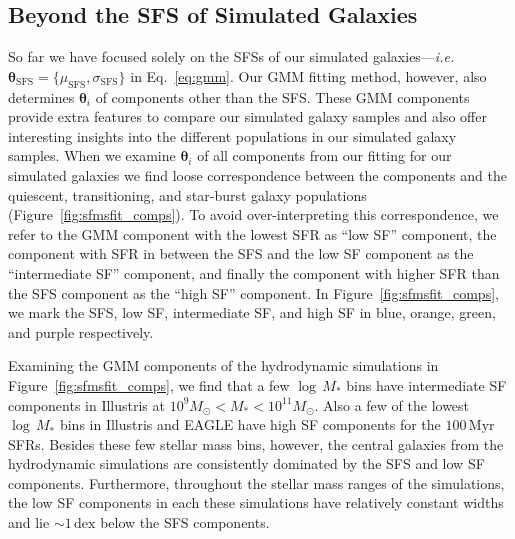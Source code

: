 \documentclass[preprint2,tighten]{aastex62}
\begin{document}
\subsection{Beyond the SFS of Simulated Galaxies} \label{sec:beyondsfms}
So far we have focused solely on the SFSs of our simulated 
galaxies---\emph{i.e.} 
$\bm{\theta}_\mathrm{SFS} = \{\mu_\mathrm{SFS}, \sigma_\mathrm{SFS} \}$ 
in Eq.~\ref{eq:gmm}. Our GMM fitting method, however, also determines 
$\bm{\theta}_i$ of components other than the SFS. These GMM components 
provide extra features to compare our simulated galaxy samples and also 
offer interesting insights into the different populations in our simulated 
galaxy samples. When we examine $\bm{\theta}_i$ of all components from 
our fitting for our simulated galaxies we find loose correspondence between 
the components and the quiescent, transitioning, and star-burst galaxy 
populations (Figure~\ref{fig:sfmsfit_comps}). To avoid over-interpreting 
this correspondence, we refer to the GMM component with the lowest SFR as 
``low SF'' component, the component with SFR in between the SFS and the 
low SF component as the ``intermediate SF'' component, and finally the 
component with higher SFR than the SFS component as the ``high SF'' component. 
In Figure~\ref{fig:sfmsfit_comps}, we mark the SFS, low SF, intermediate SF, 
and high SF in blue, orange, green, and purple respectively.

Examining the GMM components of the hydrodynamic simulations in 
Figure~\ref{fig:sfmsfit_comps}, we find that a few $\log\,M_*$ bins have 
intermediate SF components in Illustris at $10^9 M_\odot < M_* < 10^{11}M_\odot$.
Also a few of the lowest $\log\,M_*$ bins in Illustris and EAGLE have high SF
components for the $100\,\mathrm{Myr}$ SFRs. Besides these few stellar mass 
bins, however, the central galaxies from the hydrodynamic simulations are
consistently dominated by the SFS and low SF components. Furthermore, 
throughout the stellar mass ranges of the simulations, the low SF 
components in each these simulations have relatively constant widths and 
lie ${\sim}1\,\mathrm{dex}$ below the SFS components.
\end{document}
